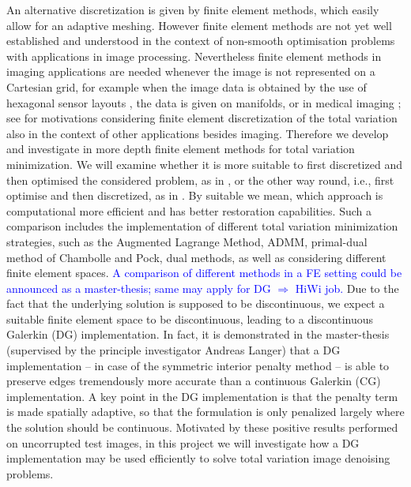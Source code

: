\documentclass[enabledeprecatedfontcommands,cleardoublepage=empty,headsepline,twoside,11pt,DIV=15,BCOR=12mm,final]{scrartcl}
\begin{document}
 An alternative discretization is given by finite element methods, which easily allow for an adaptive meshing. However finite element methods are not yet well established and understood in the context of non-smooth optimisation problems with applications in image processing. Nevertheless finite element methods in imaging applications are needed whenever the image is not represented on a Cartesian grid, for example when the image data is obtained by the use of hexagonal sensor layouts \cite{}, the data is given on manifolds, or in medical imaging \cite{}; see \cite{} for motivations considering finite element discretization of the total variation also in the context of other applications besides imaging.  
  Therefore we develop and investigate in more depth finite element methods for total variation minimization. We will examine whether it is more suitable to first discretized and then optimised the considered problem, as in \cite{Herzog etal}, or the other way round, i.e., first optimise and then discretized, as in \cite{AlkLan}. By suitable we mean, which approach is computational more efficient and has better restoration capabilities. %
  Such a comparison includes the implementation of different total variation minimization strategies, such as the Augmented Lagrange Method, ADMM, primal-dual method of Chambolle and Pock, dual methods, as well as considering different finite element spaces. \textcolor{blue}{A comparison of different methods in a FE setting could be announced as a master-thesis; same may apply for DG $\Rightarrow$ HiWi job.} Due to the fact that the underlying solution is supposed to be discontinuous, we expect a suitable finite element space to be discontinuous, leading to a discontinuous Galerkin (DG) implementation. In fact, it is demonstrated in the master-thesis \cite{Dieterich} (supervised by the principle investigator Andreas Langer) that a DG implementation -- in case of the symmetric interior penalty method -- is able to preserve edges tremendously more accurate than a continuous Galerkin (CG) implementation. A key point in the DG implementation is that the penalty term is made spatially adaptive, so that the formulation is only penalized largely where the solution should be continuous. Motivated by these positive results performed on uncorrupted test images, in this project we will investigate how a DG implementation may be used efficiently to solve total variation image denoising problems. 
  
\end{document}
